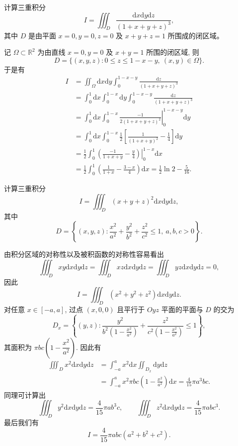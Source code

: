 \documentclass[12pt,fontset=fandol]{ctexart}
\begin{document}
\begin{example}\label{course-example-15-3-5}\quad 计算三重积分
\[
  I=\iiint_D\frac{\mathrm dx\mathrm dy\mathrm dz}{(1+x+y+z)^3},
\]
其中 $D$ 是由平面 $x=0,y=0,z=0$ 及 $x+y+z=1$ 所围成的闭区域。

\end{example}
\begin{solve}\quad 记 $\Omega\subset\mathbb R^2$ 为由直线 $x=0,y=0$ 及 $x+y=1$ 所围的闭区域, 则
\[
  D=\{(x,y,z):0\leqslant z\leqslant1-x-y,\ (x,y)\in\Omega\}.
\]
于是有
\[
\begin{aligned}
  I
  &=\iint_\Omega\mathrm dx\mathrm dy\int_0^{1-x-y}\frac{\mathrm dz}{(1+x+y+z)^3}\\
  &=\int_0^1\mathrm dx\int_0^{1-x}\mathrm dy\int_0^{1-x-y}\frac{\mathrm dz}{(1+x+y+z)^3}\\
  &=\int_0^1\mathrm dx\int_0^{1-x}
    \left.\frac{-1}{2(1+x+y+z)^2}\right|_0^{1-x-y}\mathrm dy\\
  &=\int_0^1\mathrm dx\int_0^{1-x}\frac12\left[\frac1{(1+x+y)^2}-\frac14\right]\mathrm dy\\
  &=\frac12\int_0^1\left.\left(\frac{-1}{1+x+y}-\frac y4\right)\right|_0^{1-x}\mathrm dx\\
  &=\frac12\int_0^1\left(\frac1{1+x}-\frac{3-x}{4}\right)\mathrm dx
    =\frac12\ln2-\frac5{16}.
\end{aligned}
\]

\end{solve}
\begin{example}\label{course-example-15-3-6}\quad 计算三重积分
\[
  I=\iiint_D (x+y+z)^2\mathrm dx\mathrm dy\mathrm dz,
\]
其中
\[
  D=\left\{(x,y,z):\frac{x^2}{a^2}+\frac{y^2}{b^2}+\frac{z^2}{c^2}\leqslant1,\ a,b,c>0\right\}.
\]

\end{example}
\begin{solve}\quad 由积分区域的对称性以及被积函数的对称性容易看出
\[
  \iiint_D xy\mathrm dx\mathrm dy\mathrm dz
  =\iiint_D xz\mathrm dx\mathrm dy\mathrm dz
  =\iiint_D yz\mathrm dx\mathrm dy\mathrm dz=0,
\]
因此
\[
  I=\iiint_D (x^2+y^2+z^2)\mathrm dx\mathrm dy\mathrm dz.
\]
对任意 $x\in[-a,a]$, 过点 $(x,0,0)$ 且平行于 $Oyz$ 平面的平面与 $D$ 的交为
\[
  D_x=\left\{(y,z):\frac{y^2}{b^2\left(1-\frac{x^2}{a^2}\right)}
  +\frac{z^2}{c^2\left(1-\frac{x^2}{a^2}\right)}\leqslant1\right\},
\]
其面积为 $\pi bc\left(1-\dfrac{x^2}{a^2}\right)$. 因此有
\[
\begin{aligned}
  \iiint_D x^2\mathrm dx\mathrm dy\mathrm dz
  &=\int_{-a}^a x^2\mathrm dx\iint_{D_x}\mathrm dy\mathrm dz\\
  &=\int_{-a}^a x^2\pi bc\left(1-\frac{x^2}{a^2}\right)\mathrm dx
    =\frac4{15}\pi a^3bc.
\end{aligned}
\]
同理可计算出
\[
  \iiint_D y^2\mathrm dx\mathrm dy\mathrm dz=\frac4{15}\pi ab^3c,\qquad
  \iiint_D z^2\mathrm dx\mathrm dy\mathrm dz=\frac4{15}\pi abc^3.
\]
最后我们有
\[
  I=\frac4{15}\pi abc(a^2+b^2+c^2).
\]

\end{solve}
\end{document}
